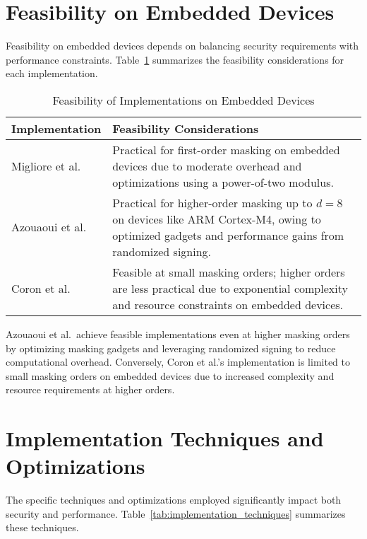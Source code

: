 \section{Feasibility on Embedded Devices}

Feasibility on embedded devices depends on balancing security requirements with performance constraints. Table~\ref{tab:feasibility} summarizes the feasibility considerations for each implementation.

\begin{table}[h]
    \centering
    \caption{Feasibility of Implementations on Embedded Devices}
    \begin{tabular}{l p{10cm}}
        \toprule
        \textbf{Implementation}            & \textbf{Feasibility Considerations}                                                                                                                     \\
        \midrule
        Migliore et al.\ \cite{Migliore19} & Practical for first-order masking on embedded devices due to moderate overhead and optimizations using a power-of-two modulus.                          \\
        Azouaoui et al.\ \cite{Azouaoui22} & Practical for higher-order masking up to $d=8$ on devices like ARM Cortex-M4, owing to optimized gadgets and performance gains from randomized signing. \\
        Coron et al.\ \cite{Coron23}       & Feasible at small masking orders; higher orders are less practical due to exponential complexity and resource constraints on embedded devices.          \\
        \bottomrule
    \end{tabular}
    \label{tab:feasibility}
\end{table}

Azouaoui et al.\ achieve feasible implementations even at higher masking orders by optimizing masking gadgets and leveraging randomized signing to reduce computational overhead. Conversely, Coron et al.'s implementation is limited to small masking orders on embedded devices due to increased complexity and resource requirements at higher orders.

\section{Implementation Techniques and Optimizations}

The specific techniques and optimizations employed significantly impact both security and performance. Table~\ref{tab:implementation_techniques} summarizes these techniques.

